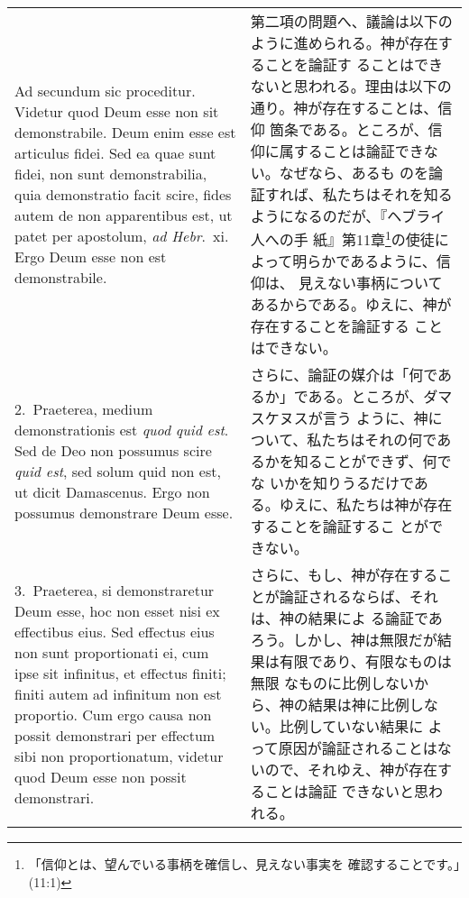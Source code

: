 \documentclass[10pt]{jsarticle}
\begin{document}
\begin{longtable}{p{21em}p{21em}}

{\huge A}{\sc d secundum sic proceditur}. Videtur quod Deum esse non
sit demonstrabile. Deum enim esse est articulus fidei. Sed ea quae
sunt fidei, non sunt demonstrabilia, quia demonstratio facit scire,
fides autem de non apparentibus est, ut patet per apostolum, {\it ad
Hebr}.~{\sc xi}. Ergo Deum esse non est demonstrabile.

&

第二項の問題へ、議論は以下のように進められる。神が存在することを論証す
ることはできないと思われる。理由は以下の通り。神が存在することは、信仰
箇条である。ところが、信仰に属することは論証できない。なぜなら、あるも
のを論証すれば、私たちはそれを知るようになるのだが、『ヘブライ人への手
紙』第11章\footnote{「信仰とは、望んでいる事柄を確信し、見えない事実を
確認することです。」(11:1)}の使徒によって明らかであるように、信仰は、
見えない事柄についてあるからである。ゆえに、神が存在することを論証する
ことはできない。

\\

2.~{\sc Praeterea}, medium demonstrationis est {\it quod quid
 est}. Sed de Deo non possumus scire {\it quid est}, sed solum quid
 non est, ut dicit Damascenus. Ergo non possumus demonstrare Deum
 esse.

&

さらに、論証の媒介は「何であるか」である。ところが、ダマスケヌスが言う
ように、神について、私たちはそれの何であるかを知ることができず、何でな
いかを知りうるだけである。ゆえに、私たちは神が存在することを論証するこ
とができない。

\\

3.~{\sc Praeterea}, si demonstraretur Deum esse, hoc non esset nisi ex
effectibus eius. Sed effectus eius non sunt proportionati ei, cum ipse
sit infinitus, et effectus finiti; finiti autem ad infinitum non est
proportio. Cum ergo causa non possit demonstrari per effectum sibi non
proportionatum, videtur quod Deum esse non possit demonstrari.

&

さらに、もし、神が存在することが論証されるならば、それは、神の結果によ
る論証であろう。しかし、神は無限だが結果は有限であり、有限なものは無限
なものに比例しないから、神の結果は神に比例しない。比例していない結果に
よって原因が論証されることはないので、それゆえ、神が存在することは論証
できないと思われる。

\\


\end{longtable}
\end{document}
